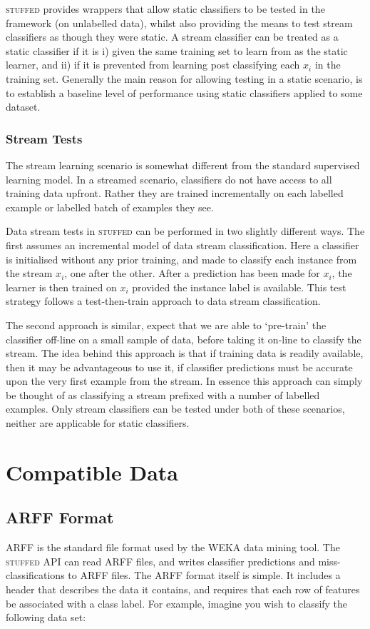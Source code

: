 \documentclass[twoside,a4paper]{refart}
\begin{document}
\textsc{stuffed} provides wrappers that allow static classifiers to be tested in the framework (on unlabelled data), whilst also providing the means to test stream classifiers as though they were static. A stream classifier can be treated as a static classifier if it is i) given the same training set to learn from as the static learner, and ii) if it is prevented from learning post classifying each $x_{i}$ in the training set. Generally the main reason for allowing testing in a static scenario, is to establish a baseline level of performance using static classifiers applied to some dataset. 

\subsubsection{Stream Tests}
The stream learning scenario is somewhat different from the standard supervised learning model. In a streamed scenario, classifiers do not have access to all training data upfront. Rather they are trained incrementally on each labelled example or labelled batch of examples they see.

Data stream tests in \textsc{stuffed} can be performed in two slightly different ways. The first assumes an incremental model of data stream classification. Here a classifier is initialised without any prior training, and made to classify each instance from the stream $x_{i}$, one after the other. After a prediction has been made for $x_{i}$, the learner is then trained on $x_{i}$ provided the instance label is available. This test strategy follows a test-then-train approach to data stream classification.

The second approach is similar, expect that we are able to `pre-train' the classifier off-line on a small sample of data, before taking it on-line to classify the stream. The idea behind this approach is that if training data is readily available, then it may be advantageous to use it, if classifier predictions must be accurate upon the very first example from the stream. In essence this approach can simply be thought of as classifying a stream prefixed with a number of labelled examples. Only stream classifiers can be tested under both of these scenarios, neither are applicable for static classifiers. 
\newpage
\section{Compatible Data}
\subsection{ARFF Format}
ARFF is the standard file format used by the WEKA data mining tool. The \textsc{stuffed} API can read ARFF files, and writes classifier predictions and miss-classifications to ARFF files. The ARFF format itself is simple. It includes a header that describes the data it contains, and requires that each row of features be associated with a class label. For example, imagine you wish to classify the following data set:
\end{document}
